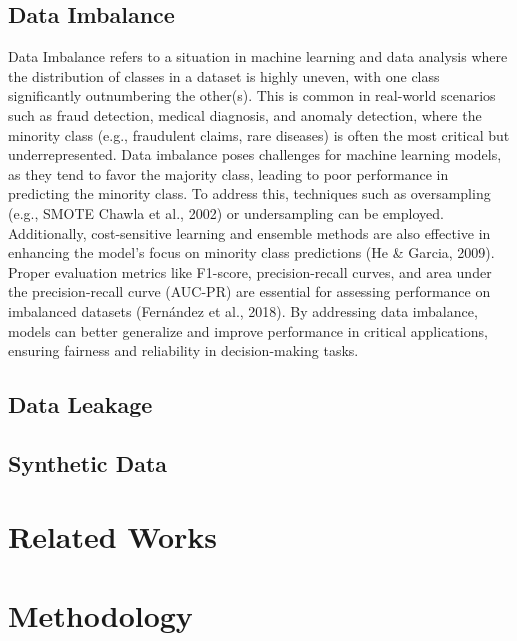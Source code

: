 \documentclass[twoside,11pt]{article}
\begin{document}
\subsection{Data Imbalance}
Data Imbalance refers to a situation in machine learning and data analysis where the distribution of classes in a dataset is highly uneven, with one class significantly outnumbering the other(s). This is common in real-world scenarios such as fraud detection, medical diagnosis, and anomaly detection, where the minority class (e.g., fraudulent claims, rare diseases) is often the most critical but underrepresented. Data imbalance poses challenges for machine learning models, as they tend to favor the majority class, leading to poor performance in predicting the minority class.
To address this, techniques such as oversampling (e.g., SMOTE \cite{viaeneInsuranceFraudIssues2004} Chawla et al., 2002) or undersampling can be employed. Additionally, cost-sensitive learning and ensemble methods are also effective in enhancing the model's focus on minority class predictions (He & Garcia, 2009). Proper evaluation metrics like F1-score, precision-recall curves, and area under the precision-recall curve (AUC-PR) are essential for assessing performance on imbalanced datasets (Fernández et al., 2018).
By addressing data imbalance, models can better generalize and improve performance in critical applications, ensuring fairness and reliability in decision-making tasks.
\subsection{Data Leakage}

\subsection{Synthetic Data}


\section{Related Works}


\section{Methodology}
\end{document}
